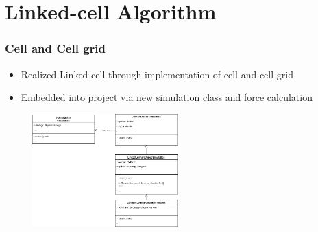 
\section{Linked-cell Algorithm}
\label{sec:lc}

\begin{frame}
    \frametitle{Cell and Cell grid}

    \begin{itemize}
        \item Realized Linked-cell through implementation of cell and cell grid
        \item Embedded into project via new simulation class and force calculation
    \end{itemize}
    \begin{figure}
        \label{fig:umlsim}
        \includegraphics[width=0.5\textwidth]{res/UMLSimulation3.drawio}
    \end{figure}
\end{frame}
